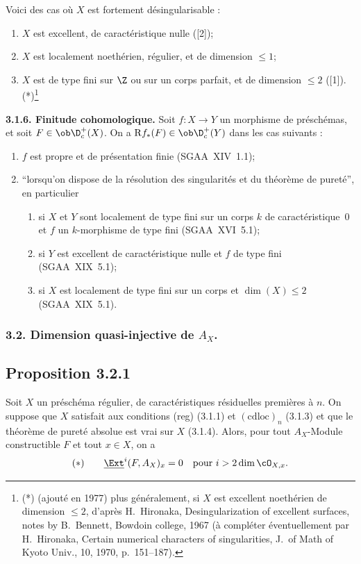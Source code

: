 Voici des cas où $X$ est fortement désingularisable :
\begin{enumerate}
\item[a)] $X$ est excellent, de caractéristique nulle ([2]);
\item[b)] $X$ est localement noethérien, régulier, et de dimension $\leqslant 1$;
\item[c)] $X$ est de type fini sur $\Z$ ou sur un corps parfait, et de dimension $\leqslant 2$ ([1]).(*)\footnote{(*) (ajouté en 1977) plus généralement, si $X$ est excellent noethérien de dimension $\leqslant 2$, d'après H.~Hironaka, Desingularization of excellent surfaces, notes by B.~Bennett, Bowdoin college, 1967 (à compléter éventuellement par H.~Hironaka, Certain numerical characters of singularities, J.~of Math of Kyoto Univ., 10, 1970, p.~151--187).}
\end{enumerate}

\textbf{3.1.6. Finitude cohomologique.} Soit $f : X \to Y$ un morphisme de préschémas, et soit $F \in \ob \D_c^{+}(X)$. On a $\mathrm{R} f_{*}(F) \in \ob \D_c^{+}(Y)$ dans les cas suivants :
\begin{enumerate}
\item[a)] $f$ est propre et de présentation finie (SGAA~XIV~1.1);
\item[b)] ``lorsqu'on dispose de la résolution des singularités et du théorème de pureté'', en particulier
\begin{enumerate}
\item[(i)] si $X$ et $Y$ sont localement de type fini sur un corps $k$ de caractéristique~0 et $f$ un $k$-morphisme de type fini (SGAA~XVI~5.1);
\item[(ii)] si $Y$ est excellent de caractéristique nulle et $f$ de type fini (SGAA~XIX~5.1);
\item[(iii)] si $X$ est localement de type fini sur un corps et $\dim(X) \leqslant 2$ (SGAA~XIX~5.1).
\end{enumerate}
\end{enumerate}

\subsubsection*{3.2. Dimension quasi-injective de \texorpdfstring{$A_X$}{A\_X}.}

\subsection*{Proposition 3.2.1}
Soit $X$ un préschéma régulier, de caractéristiques résiduelles premières à $n$. On suppose que $X$ satisfait aux conditions (reg) (3.1.1) et $(\mathrm{cdloc})_n$ (3.1.3) et que le théorème de pureté absolue est vrai sur $X$ (3.1.4). Alors, pour tout $A_X$-Module constructible $F$ et tout $x \in X$, on a
\[
(*) \qquad \underline{\Ext}^i(F, A_X)_x = 0 \quad \text{pour } i > 2\dim \cO_{X,x}.
\]

